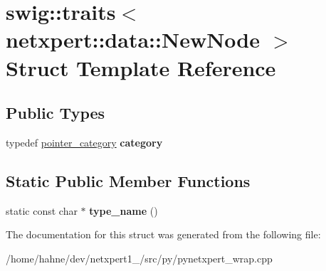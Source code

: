 \hypertarget{structswig_1_1traits_3_01netxpert_1_1data_1_1NewNode_01_4}{}\section{swig\+:\+:traits$<$ netxpert\+:\+:data\+:\+:New\+Node $>$ Struct Template Reference}
\label{structswig_1_1traits_3_01netxpert_1_1data_1_1NewNode_01_4}
\subsection*{Public Types}
\begin{DoxyCompactItemize}
\item 
typedef \hyperlink{structswig_1_1pointer__category}{pointer\+\_\+category} {\bfseries category}\hypertarget{structswig_1_1traits_3_01netxpert_1_1data_1_1NewNode_01_4_a067f26c4e0103ed43fab0378e3c8fa44}{}\label{structswig_1_1traits_3_01netxpert_1_1data_1_1NewNode_01_4_a067f26c4e0103ed43fab0378e3c8fa44}

\end{DoxyCompactItemize}
\subsection*{Static Public Member Functions}
\begin{DoxyCompactItemize}
\item 
static const char $\ast$ {\bfseries type\+\_\+name} ()\hypertarget{structswig_1_1traits_3_01netxpert_1_1data_1_1NewNode_01_4_aa21315818d5e766032a64e86ea67a78a}{}\label{structswig_1_1traits_3_01netxpert_1_1data_1_1NewNode_01_4_aa21315818d5e766032a64e86ea67a78a}

\end{DoxyCompactItemize}


The documentation for this struct was generated from the following file\+:\begin{DoxyCompactItemize}
\item 
/home/hahne/dev/netxpert1\+\_/src/py/pynetxpert\+\_\+wrap.\+cpp\end{DoxyCompactItemize}
